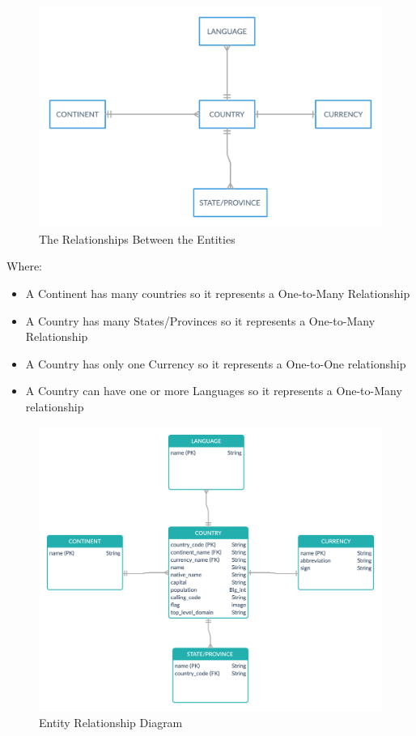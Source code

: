 \documentclass[twoside, a4paper, 12pt]{report}
\begin{document}
\begin{figure} [h]
	\centering
	\includegraphics[width=1.0\textwidth]{relationships.png}
	\caption{The Relationships Between the Entities}
	\label{fig:relationships}
\end{figure}

Where:
\begin{itemize}
	\item A Continent has many countries so it represents a One-to-Many Relationship
	\item A Country has many States/Provinces so it represents a One-to-Many Relationship
	\item A Country has only one Currency so it represents a One-to-One relationship
	\item A Country can have one or more Languages so it represents a One-to-Many relationship
\end{itemize}

\begin{figure} [h]
	\centering
	\includegraphics[width=1.0\textwidth]{ERD.png}
	\caption{Entity Relationship Diagram}
	\label{fig:ERD}
\end{figure}
\end{document}

